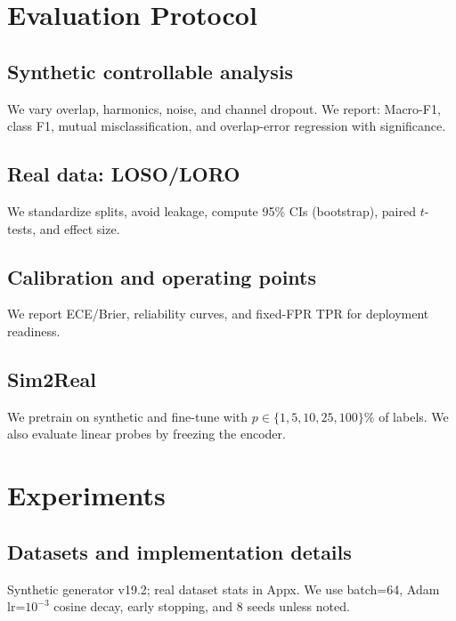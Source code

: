 \documentclass[10pt,conference]{IEEEtran}
\begin{document}
\section{Evaluation Protocol}
\subsection{Synthetic controllable analysis}
We vary overlap, harmonics, noise, and channel dropout. We report: Macro-F1, class F1, mutual misclassification, and overlap-error regression with significance.
\subsection{Real data: LOSO/LORO}
We standardize splits, avoid leakage, compute 95\% CIs (bootstrap), paired $t$-tests, and effect size.
\subsection{Calibration and operating points}
We report ECE/Brier, reliability curves, and fixed-FPR TPR for deployment readiness.
\subsection{Sim2Real}
We pretrain on synthetic and fine-tune with $p\in\{1,5,10,25,100\}\%$ of labels. We also evaluate linear probes by freezing the encoder.

\section{Experiments}
\subsection{Datasets and implementation details}
Synthetic generator v19.2; real dataset stats in Appx. We use batch=64, Adam lr=$10^{-3}$ cosine decay, early stopping, and 8 seeds unless noted.
\end{document}

